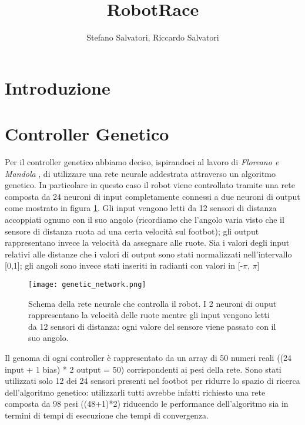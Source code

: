 \documentclass[]{report}
\title{RobotRace}
\author{Stefano Salvatori, Riccardo Salvatori}
\begin{document}
\maketitle

\section{Introduzione}


\section{Controller Genetico}
Per il controller genetico abbiamo deciso, ispirandoci al lavoro di \textit{Floreano e Mandola} \cite{genetic_evolution_nn},  di utilizzare una rete neurale addestrata attraverso un algoritmo genetico. In particolare in questo caso il robot viene controllato tramite una rete composta da 24 neuroni di input completamente connessi a due neuroni di output come mostrato in figura \ref{fig:genetic_network}.
Gli input vengono letti da 12 sensori di distanza accoppiati ognuno con il suo angolo (ricordiamo che l'angolo varia visto che il sensore di distanza ruota ad una certa velocità sul footbot); gli output rappresentano invece la velocità da assegnare alle ruote. Sia i valori degli input relativi alle distanze che i valori di output sono stati normalizzati nell'intervallo [0,1]; gli angoli sono invece stati inseriti in radianti con valori in [-$\pi$, $\pi$]
\begin{figure}[h]
\centering
\texttt{[image: genetic\_network.png]}
\caption{Schema della rete neurale che controlla il robot. I 2 neuroni di ouput rappresentano la velocità delle ruote mentre gli input vengono letti da  12 sensori di distanza: ogni valore del sensore viene passato con il suo angolo. }
\label{fig:genetic_network}
\end{figure}


Il genoma di ogni controller è rappresentato da un array di 50 numeri reali ((24 input + 1 bias) * 2  output = 50) corrispondenti ai pesi della rete.
Sono stati utilizzati solo 12 dei 24 sensori presenti nel footbot per ridurre lo spazio di ricerca dell'algoritmo genetico: utilizzarli tutti avrebbe infatti richiesto una rete composta da 98 pesi ((48+1)*2) riducendo le performance dell'algoritmo sia in termini di tempi di esecuzione che tempi di convergenza.




\end{document}
